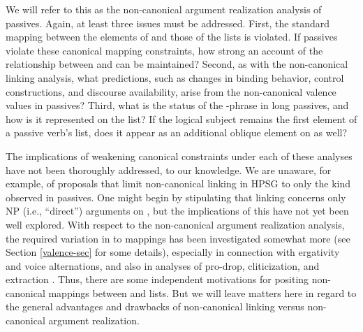 \documentclass[output=paper
                ,modfonts
                ,nonflat
	        ,collection
	        ,collectionchapter
	        ,collectiontoclongg
 	        ,biblatex
                ,babelshorthands
                ,newtxmath
                ,draftmode
                ,colorlinks, citecolor=brown
]{./langsci/langscibook}
\begin{document}

We will refer to this as the non-canonical argument realization analysis of passives. Again, at least three 
issues must be addressed.
First, the standard mapping between the elements of \argst and those of the \val lists is violated.
If passives violate these canonical mapping constraints, how strong an account of the relationship between \argst and \val can be maintained?
Second, as with the non-canonical linking analysis, what predictions, such as changes in binding behavior, control constructions, and discourse availability, arise from the non-canonical valence values in passives?
Third, what is the status of the -phrase in long passives, and how is it represented on the \argst list?  If the logical subject remains the first element of a passive verb's \argst list, does it appear as an additional oblique element on \argst as well? 

The implications of weakening canonical constraints under each of these analyses have not been thoroughly addressed, to our knowledge.
We are unaware, for example, of proposals that limit non-canonical linking in HPSG to only the kind observed in passives.
One might begin by stipulating that linking concerns only NP (i.e., ``direct'') arguments on \argst, but the implications of this have not yet been well explored.
With respect to the non-canonical argument realization analysis, the required variation in \argst to \val mappings has been investigated somewhat more (see Section \ref{valence-sec} for some details), especially in connection with ergativity and voice alternations, and also in analyses of pro-drop, cliticization, and extraction \citep{MillerandSag1997, Manning+Sag:1999, Boumaetal2001}.
Thus, there are some independent motivations for positing non-canonical mappings between \argst and \val lists.
But we will leave matters here in regard to the general advantages and drawbacks of non-canonical linking versus non-canonical argument realization.
\end{document}
